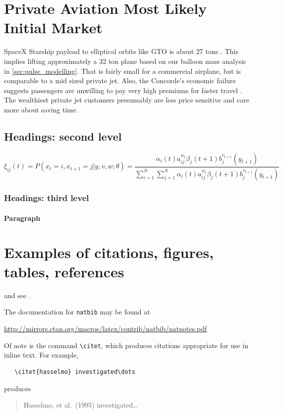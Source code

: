 \documentclass{article}
\begin{document}
\section{Private Aviation Most Likely Initial Market}
SpaceX Starship payload to elliptical orbits like GTO is about 27 tons \cite{spacex_user_guide}.   This implies lifting approximately a 32 ton plane based on our balloon mass analysis in \autoref{sec:pulse_modelling}.   That is fairly small for a commercial airplane, but is comparable to a mid sized private jet.   Also, the Concorde's economic failure suggests passengers are unwilling to pay very high premiums for faster travel \cite{concorde_expensive}.  The wealthiest private jet customers presumably are less price sensitive and care more about saving time.



\subsection{Headings: second level}
\lipsum[5]
\begin{equation}
\xi _{ij}(t)=P(x_{t}=i,x_{t+1}=j|y,v,w;\theta)= {\frac {\alpha _{i}(t)a^{w_t}_{ij}\beta _{j}(t+1)b^{v_{t+1}}_{j}(y_{t+1})}{\sum _{i=1}^{N} \sum _{j=1}^{N} \alpha _{i}(t)a^{w_t}_{ij}\beta _{j}(t+1)b^{v_{t+1}}_{j}(y_{t+1})}}
\end{equation}

\subsubsection{Headings: third level}
\lipsum[6]

\paragraph{Paragraph}
\lipsum[7]

\section{Examples of citations, figures, tables, references}
\label{sec:others}
\lipsum[8] \cite{kour2014real,kour2014fast} and see \cite{hadash2018estimate}.

The documentation for \verb+natbib+ may be found at
\begin{center}
  \url{http://mirrors.ctan.org/macros/latex/contrib/natbib/natnotes.pdf}
\end{center}
Of note is the command \verb+\citet+, which produces citations
appropriate for use in inline text.  For example,
\begin{verbatim}
   \citet{hasselmo} investigated\dots
\end{verbatim}
produces
\begin{quote}
  Hasselmo, et al.\ (1995) investigated\dots
\end{quote}
\end{document}
